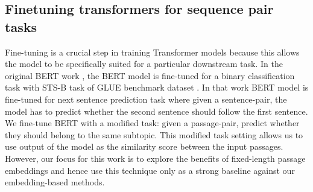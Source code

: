 \subsection{Finetuning transformers for sequence pair tasks} Fine-tuning is a crucial step in training Transformer models because this allows the model to be specifically suited for a particular downstream task. In the original BERT work \cite{devlin2018bert}, the BERT model is fine-tuned for a binary classification task with STS-B task of GLUE benchmark dataset \cite{wang2018glue}. In that work BERT model is fine-tuned for next sentence prediction task where given a sentence-pair, the model has to predict whether the second sentence should follow the first sentence. We fine-tune BERT with a modified task: given a passage-pair, predict whether they should belong to the same subtopic. This modified task setting allows us to use output of the model as the similarity score between the input passages. However, our focus for this work is to explore the benefits of fixed-length passage embeddings and hence use this technique only as a strong baseline against our embedding-based methods.